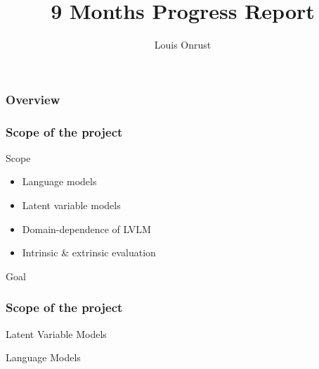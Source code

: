 \documentclass{beamer}
\title{9 Months Progress Report}
\author{Louis Onrust}
\begin{document}
\begin{frame}
    \titlepage
\end{frame}

\begin{frame}
    \frametitle{Overview}

\end{frame}

\begin{frame}
    \frametitle{Scope of the project}

    \begin{block}{Scope}
        \begin{itemize}
            \item Language models
            \item Latent variable models
            \item Domain-dependence of LVLM
            \item Intrinsic \& extrinsic evaluation
        \end{itemize}
    \end{block}

    \begin{block}{Goal}
    
    \end{block}
\end{frame}

\begin{frame}
    \frametitle{Scope of the project}

    \begin{block}{Latent Variable Models}
    
    \end{block}

    \begin{block}{Language Models}

    \end{block}
\end{frame}

\
\end{document}
